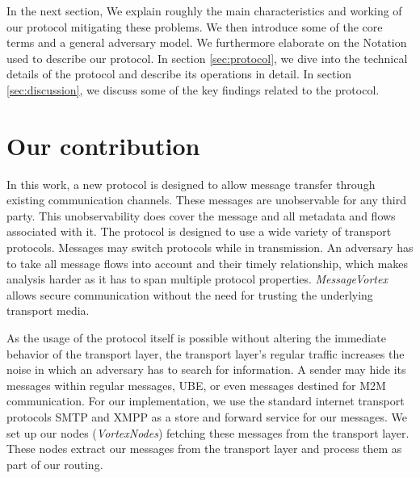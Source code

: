 \documentclass[acmsmall, screen]{acmart}
\begin{document}
In the next section, We explain roughly the main characteristics and working of our protocol mitigating these problems. We then introduce some of the core terms and a general adversary model. We furthermore elaborate on the Notation used to describe our protocol. In section \ref{sec:protocol}, we dive into the technical details of the protocol and describe its operations in detail. In section \ref{sec:discussion}, we discuss some of the key findings related to the protocol.

\section{Our contribution}
In this work, a new protocol is designed to allow message transfer through existing communication channels. These messages are unobservable for any third party. This unobservability does cover the message and all metadata and flows associated with it.  The protocol is designed to use a wide variety of transport protocols. Messages may switch protocols while in transmission. An adversary has to take all message flows into account and their timely relationship, which makes analysis harder as it has to span multiple protocol properties. \emph{MessageVortex} allows secure communication without the need for trusting the underlying transport media.

As the usage of the protocol itself is possible without altering the immediate behavior of the transport layer, the transport layer's regular traffic increases the noise in which an adversary has to search for information. A sender may hide its messages within regular messages, UBE, or even messages destined for M2M communication. For our implementation, we use the standard internet transport protocols SMTP and XMPP as a store and forward service for our messages. We set up our nodes (\emph{VortexNodes}) fetching these messages from the transport layer. These nodes extract our messages from the transport layer and process them as part of our routing. 
\end{document}
